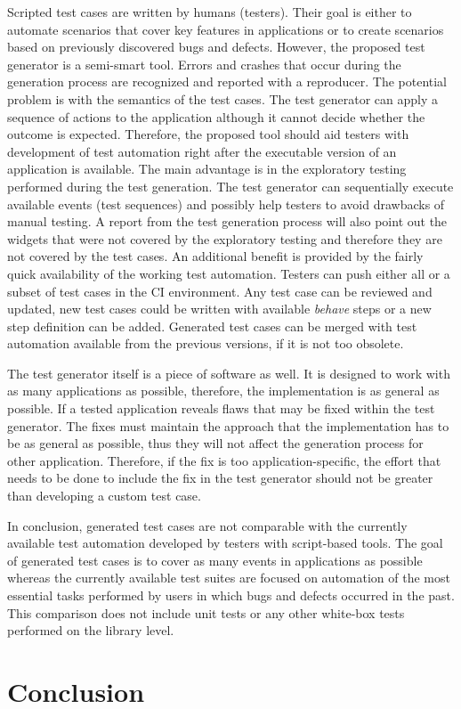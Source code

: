 Scripted test cases are written by humans (testers). Their goal is either to automate scenarios that cover key features in applications or to create scenarios based on previously discovered bugs and defects. However, the proposed test generator is a semi-smart tool. Errors and crashes that occur during the generation process are recognized and reported with a reproducer. The potential problem is with the semantics of the test cases. The test generator can apply a sequence of actions to the application although it cannot decide whether the outcome is expected. Therefore, the proposed tool should aid testers with development of test automation right after the executable version of an application is available. The main advantage is in the exploratory testing performed during the test generation. The test generator can sequentially execute available events (test sequences) and possibly help testers to avoid drawbacks of manual testing. A report from the test generation process will also point out the widgets that were not covered by the exploratory testing and therefore they are not covered by the test cases. An additional benefit is provided by the fairly quick availability of the working test automation. Testers can push either all or a subset of test cases in the CI environment. Any test case can be reviewed and updated, new test cases could be written with available \textit{behave} steps or a new step definition can be added. Generated test cases can be merged with test automation available from the previous versions, if it is not too obsolete.

The test generator itself is a piece of software as well. It is designed to work with as many applications as possible, therefore, the implementation is as general as possible. If a tested application reveals flaws that may be fixed within the test generator. The fixes must maintain the approach that the implementation has to be as general as possible, thus they will not affect the generation process for other application. Therefore, if the fix is too application-specific, the effort that needs to be done to include the fix in the test generator should not be greater than developing a custom test case.

In conclusion, generated test cases are not comparable with the currently available test automation developed by testers with script-based tools. The goal of generated test cases is to cover as many events in applications as possible whereas the currently available test suites are focused on automation of the most essential tasks performed by users in which bugs and defects occurred in the past. This comparison does not include unit tests or any other white-box tests performed on the library level.


\chapter{Conclusion}

